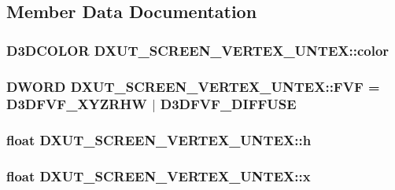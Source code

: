 \subsection{Member Data Documentation}
\hypertarget{struct_d_x_u_t___s_c_r_e_e_n___v_e_r_t_e_x___u_n_t_e_x_aad704c036aa8cb76b52a1a46cc3ace70}{
\subsubsection[{color}]{\setlength{\rightskip}{0pt plus 5cm}D3DCOLOR {\bf DXUT\_\-SCREEN\_\-VERTEX\_\-UNTEX::color}}}
\label{struct_d_x_u_t___s_c_r_e_e_n___v_e_r_t_e_x___u_n_t_e_x_aad704c036aa8cb76b52a1a46cc3ace70}
\hypertarget{struct_d_x_u_t___s_c_r_e_e_n___v_e_r_t_e_x___u_n_t_e_x_ad33ec3f4bf46dbff5fca5b39d0f72a82}{
\subsubsection[{FVF}]{\setlength{\rightskip}{0pt plus 5cm}DWORD {\bf DXUT\_\-SCREEN\_\-VERTEX\_\-UNTEX::FVF} = D3DFVF\_\-XYZRHW $|$ D3DFVF\_\-DIFFUSE}}
\label{struct_d_x_u_t___s_c_r_e_e_n___v_e_r_t_e_x___u_n_t_e_x_ad33ec3f4bf46dbff5fca5b39d0f72a82}
\hypertarget{struct_d_x_u_t___s_c_r_e_e_n___v_e_r_t_e_x___u_n_t_e_x_ab1a4ff23bc7135fb547dfde18a551ab6}{
\subsubsection[{h}]{\setlength{\rightskip}{0pt plus 5cm}float {\bf DXUT\_\-SCREEN\_\-VERTEX\_\-UNTEX::h}}}
\label{struct_d_x_u_t___s_c_r_e_e_n___v_e_r_t_e_x___u_n_t_e_x_ab1a4ff23bc7135fb547dfde18a551ab6}
\hypertarget{struct_d_x_u_t___s_c_r_e_e_n___v_e_r_t_e_x___u_n_t_e_x_a8385e54d50531a96114e6c2e1de0a2c3}{
\subsubsection[{x}]{\setlength{\rightskip}{0pt plus 5cm}float {\bf DXUT\_\-SCREEN\_\-VERTEX\_\-UNTEX::x}}}
